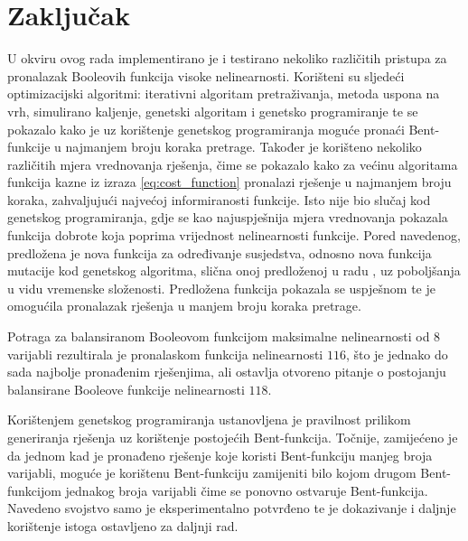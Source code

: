 \chapter{Zaključak}

U okviru ovog rada implementirano je i testirano nekoliko različitih pristupa za pronalazak Booleovih funkcija visoke nelinearnosti.
Korišteni su sljedeći optimizacijski algoritmi: iterativni algoritam pretraživanja, metoda uspona na vrh, simulirano kaljenje, genetski algoritam i genetsko programiranje te se pokazalo kako je uz korištenje genetskog programiranja moguće pronaći Bent-funkcije u najmanjem broju koraka pretrage.
Također je korišteno nekoliko različitih mjera vrednovanja rješenja, čime se pokazalo kako za većinu algoritama funkcija kazne iz izraza \eqref{eq:cost_function} pronalazi rješenje u najmanjem broju koraka, zahvaljujući najvećoj informiranosti funkcije.
Isto nije bio slučaj kod genetskog programiranja, gdje se kao najuspješnija mjera vrednovanja pokazala funkcija dobrote koja poprima vrijednost nelinearnosti funkcije.
Pored navedenog, predložena je nova funkcija za određivanje susjedstva, odnosno nova funkcija mutacije kod genetskog algoritma, slična onoj predloženoj u radu \cite{millan1997smart}, uz poboljšanja u vidu vremenske složenosti.
Predložena funkcija pokazala se uspješnom te je omogućila pronalazak rješenja u manjem broju koraka pretrage.

Potraga za balansiranom Booleovom funkcijom maksimalne nelinearnosti od $8$ varijabli rezultirala je pronalaskom funkcija nelinearnosti $116$, što je jednako do sada najbolje pronađenim rješenjima, ali ostavlja otvoreno pitanje o postojanju balansirane Booleove funkcije nelinearnosti $118$. 

Korištenjem genetskog programiranja ustanovljena je pravilnost prilikom generiranja rješenja uz korištenje postojećih Bent-funkcija.
Točnije, zamijećeno je da jednom kad je pronađeno rješenje koje koristi Bent-funkciju manjeg broja varijabli, moguće je korištenu Bent-funkciju zamijeniti bilo kojom drugom Bent-funkcijom jednakog broja varijabli čime se ponovno ostvaruje Bent-funkcija.
Navedeno svojstvo samo je eksperimentalno potvrđeno te je dokazivanje i daljnje korištenje istoga ostavljeno za daljnji rad.